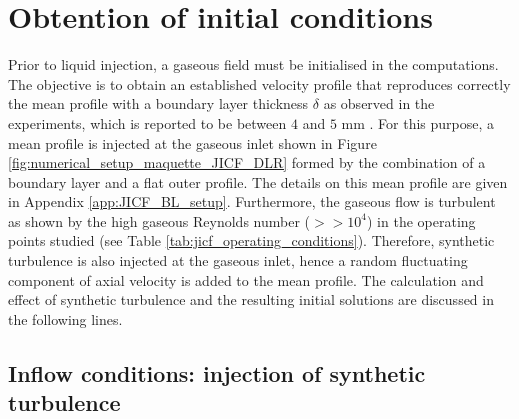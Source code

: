 \section{Obtention of initial conditions}
\label{sec:ch5_initial_conditions}

Prior to liquid injection, a gaseous field must be initialised in the computations. The objective is to obtain an established velocity profile that reproduces correctly the mean profile with a boundary layer thickness $\delta$ as observed in the experiments, which is reported to be between $4$ and $5$ mm . For this purpose, a mean profile is injected at the gaseous inlet shown in Figure \ref{fig:numerical_setup_maquette_JICF_DLR} formed by the combination of a boundary layer and a flat outer profile. The details on this mean profile are given in Appendix \ref{app:JICF_BL_setup}. Furthermore, the gaseous flow is turbulent as shown by the high gaseous Reynolds number ($>> 10^4$) in the operating points studied (see Table \ref{tab:jicf_operating_conditions}). Therefore, synthetic turbulence is also injected at the gaseous inlet, hence a random fluctuating component of axial velocity is added to the mean profile. The calculation and effect of synthetic turbulence and the resulting initial solutions are discussed in the following lines.


\subsection{Inflow conditions: injection of synthetic turbulence}


